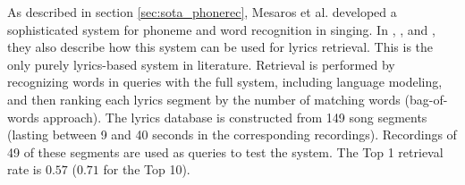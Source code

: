 As described in section \ref{sec:sota_phonerec}, Mesaros et al. developed a sophisticated system for phoneme and word recognition in singing. In \cite{mesaros1}, \cite{mesaros2}, and \cite{Mesaros2011}, they also describe how this system can be used for lyrics retrieval. This is the only purely lyrics-based system in literature. Retrieval is performed by recognizing words in queries with the full system, including language modeling, and then ranking each lyrics segment by the number of matching words (bag-of-words approach). The lyrics database is constructed from 149 song segments (lasting between 9 and 40 seconds in the corresponding recordings). Recordings of 49 of these segments are used as queries to test the system. The Top 1 retrieval rate is $0.57$ ($0.71$ for the Top 10).



